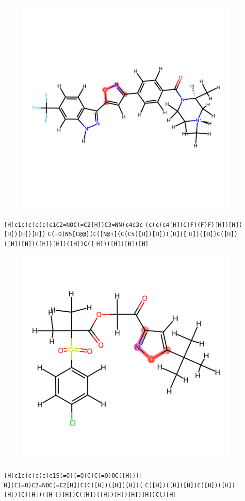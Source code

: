 \documentclass{article}
\begin{document}
\begin{figure}[ht]
\centering
    \includegraphics{mol192.png}
\end{figure}
\verb|[H]c1c(c(c(c(c1C2=NOC(=C2[H])C3=NN(c4c3c| \verb|(c(c(c4[H])C(F)(F)F)[H])[H])[H])[H])[H])| \verb|C(=O)N5[C@@](C([N@+](C(C5([H])[H])([H])[| \verb|H])([H])C([H])([H])[H])([H])[H])([H])C([| \verb|H])([H])[H])[H]|

\begin{figure}[ht]
\centering
    \includegraphics{mol193.png}
\end{figure}
\verb|[H]c1c(c(c(c(c1S(=O)(=O)C(C(=O)OC([H])([| \verb|H])C(=O)C2=NOC(=C2[H])C(C([H])([H])[H])(| \verb|C([H])([H])[H])C([H])([H])[H])(C([H])([H| \verb|])[H])C([H])([H])[H])[H])[H])Cl)[H]|
\end{document}
